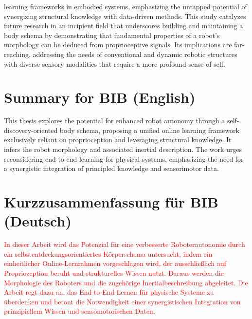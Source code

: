 \documentclass[12pt, a4paper]{article}
\newcommand{\redtext}[1]{\textcolor{red}{#1}}
\begin{document}
learning frameworks in embodied systems, emphasizing the untapped potential of synergizing structural knowledge with data-driven methods. This study catalyzes future research in an incipient field that underscores building and maintaining a body schema by demonstrating that fundamental properties of a robot's morphology can be deduced from proprioceptive signals. Its implications are far-reaching, addressing the needs of conventional and dynamic robotic structures with diverse sensory modalities that require a more profound sense of self.

\section*{Summary for BIB (English)}
This thesis explores the potential for enhanced robot autonomy through a self-discovery-oriented body schema, proposing a unified online learning framework exclusively reliant on proprioception and leveraging structural knowledge. It infers the robot morphology and associated inertial description. The work urges reconsidering end-to-end learning for physical systems, emphasizing the need for a synergistic integration of principled knowledge and sensorimotor data.

\section*{Kurzzusammenfassung für BIB (Deutsch)}
\redtext{In dieser Arbeit wird das Potenzial für eine verbesserte Roboterautonomie durch ein selbstentdeckungsorientiertes Körperschema untersucht, indem ein einheitlicher Online-Lernrahmen vorgeschlagen wird, der ausschließlich auf Propriozeption beruht und strukturelles Wissen nutzt. Daraus werden die Morphologie des Roboters und die zugehörige Inertialbeschreibung abgeleitet. Die Arbeit regt dazu an, das End-to-End-Lernen für physische Systeme zu überdenken und betont die Notwendigkeit einer synergistischen Integration von prinzipiellem Wissen und sensomotorischen Daten.}
\end{document}
